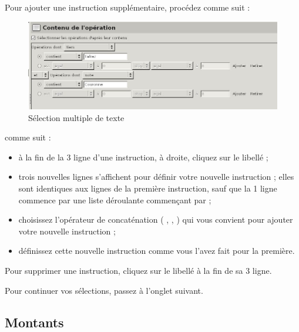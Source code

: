 Pour ajouter une instruction supplémentaire, procédez \ifIllustration comme suit :
\begin{figure}[htbp]
\begin{center}
\includegraphics[scale=0.5]{image/screenshot/reportcreation_datas_multiplesText}
\end{center}
\caption{Sélection multiple de texte}
\label{reportcreation-datas-multiplesText-img}
\end{figure}
\else comme suit :
\fi

\begin{itemize}
	\item à la fin de la 3 ligne d'une instruction, à droite, cliquez sur le libellé  ;
	 \item trois nouvelles lignes s'affichent pour définir votre nouvelle instruction ; elles sont identiques aux lignes de la première instruction, sauf que la 1 ligne commence par une liste déroulante commençant par  ;
	 \item choisissez l'opérateur de concaténation ( ,  ,  ) qui vous convient pour ajouter votre nouvelle instruction ;
	 \item définissez cette nouvelle instruction comme vous l'avez fait pour la première.
\end{itemize}

Pour supprimer une instruction, cliquez sur le libellé  à la fin de
sa 3 ligne.

Pour continuer vos sélections, passez à l'onglet suivant.

\ifIllustration
\newpage
\fi


\subsection{Montants\label{reportscreation-selection-amount}}

